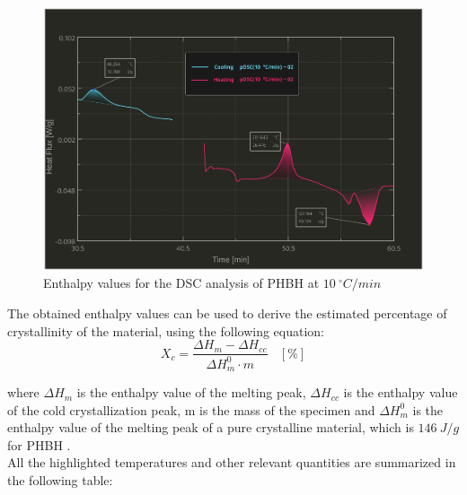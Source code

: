 \documentclass{article}
\begin{document}
        \begin{figure}[h!]
            \centering
            \includegraphics[width=\textwidth]{Pictures/Thermal_analysis_plots/DSC_peaks_areas.eps}
            \caption{Enthalpy values for the DSC analysis of PHBH at $10 \ ^{\circ}C/min$}
            \label{fig:DSC_enthalpy}
        \end{figure}

        The obtained enthalpy values can be used to derive the estimated percentage of crystallinity of the material, using the following equation: \\

        \begin{equation}
            X_c = \frac{\Delta H_{m} - \Delta H_{cc}}{\Delta H_{m}^{0} \cdot m} \ \ \ \ [\%]
            \label{eq:crystallinity}
        \end{equation}

        where $\Delta H_{m}$ is the enthalpy value of the melting peak, $\Delta H_{cc}$ is the enthalpy value of the cold crystallization peak, 
        m is the mass of the specimen and $\Delta H_{m}^{0}$ is the enthalpy value of the melting peak of a pure crystalline material, 
        which is $146 \ J/g$ for PHBH \autocites{PHBH_Crystallinity}. \\

        All the highlighted temperatures and other relevant quantities are summarized in the following table: 
\end{document}

